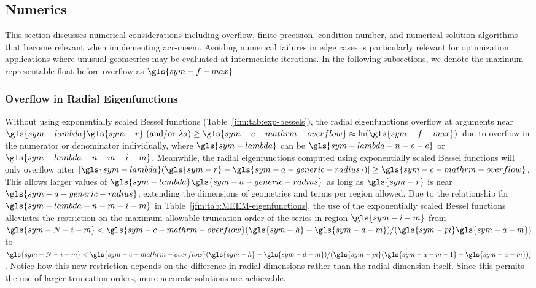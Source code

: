 \documentclass[lineno]{JFM-FLM_Au}
\begin{document}

\subsection{Numerics}\label{jfm:sec:numerics}
This section discusses numerical considerations including overflow, finite precision, condition number, and numerical solution algorithms that become relevant when implementing \gls{acr-meem}. 
Avoiding numerical failures in edge cases is particularly relevant for optimization applications where unusual geometries may be evaluated at intermediate iterations.
In the following subsections, we denote the maximum representable float before overflow as $\gls{sym-f-max}$.


\subsubsection{Overflow in Radial Eigenfunctions}
Without using exponentially scaled Bessel functions (Table~\ref{jfm:tab:exp-bessels}), the radial eigenfunctions overflow at arguments near $\gls{sym-lambda} \gls{sym-r} \text{ (and/or $\lambda a$)}\geq \gls{sym-c-mathrm-overflow} \approx \ln(\gls{sym-f-max})$ due to overflow in the numerator or denominator individually, where $\gls{sym-lambda}$ can be $\gls{sym-lambda-n-e-e}$ or $\gls{sym-lambda-n-m-i-m}$.
Meanwhile, the radial eigenfunctions computed using exponentially scaled Bessel functions will only overflow after $|\gls{sym-lambda} (\gls{sym-r} - \gls{sym-a-generic-radius})|\geq \gls{sym-c-mathrm-overflow}$.
This allows larger values of $\gls{sym-lambda} \gls{sym-a-generic-radius}$ as long as $\gls{sym-r}$ is near $\gls{sym-a-generic-radius}$, extending the dimensions of geometries and terms per region allowed.
Due to the relationship for $\gls{sym-lambda-n-m-i-m}$ in Table~\ref{jfm:tab:MEEM-eigenfunctions}, the use of the exponentially scaled Bessel functions alleviates the restriction on the maximum allowable truncation order of the series in region $\gls{sym-i-m}$ from $\gls{sym-N-i-m} < \gls{sym-c-mathrm-overflow}(\gls{sym-h}-\gls{sym-d-m}) / (\gls{sym-pi} \gls{sym-a-m})$ to $\gls{sym-N-i-m} < \gls{sym-c-mathrm-overflow}(\gls{sym-h}-\gls{sym-d-m}) / (\gls{sym-pi}(\gls{sym-a-m-1} - \gls{sym-a-m}))$.
Notice how this new restriction depends on the difference in radial dimensions rather than the radial dimension itself.
Since this permits the use of larger truncation orders, more accurate solutions are achievable.
\end{document}
